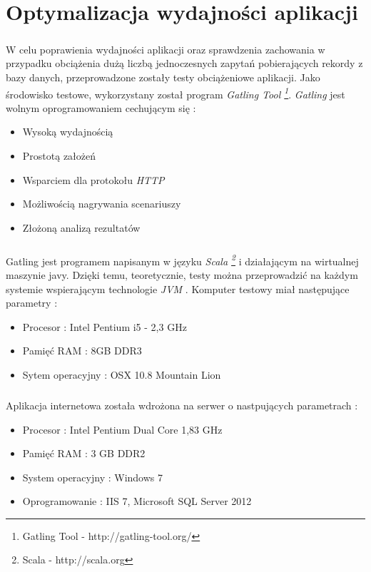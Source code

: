 \chapter{Optymalizacja wydajności aplikacji} %
\label{cha:wdra_anie}

\paragraph{} %
\label{par:}
W celu poprawienia wydajności aplikacji oraz sprawdzenia zachowania w przypadku obciążenia dużą liczbą jednoczesnych zapytań pobierających rekordy z bazy danych, przeprowadzone zostały testy obciążeniowe aplikacji. Jako środowisko testowe, wykorzystany został program \textit{Gatling Tool \footnote{Gatling Tool - http://gatling-tool.org/}}. \textit{Gatling} jest wolnym oprogramowaniem cechującym się :
\begin{itemize}
 	\item Wysoką wydajnością
 	\item Prostotą założeń
 	\item Wsparciem dla protokołu \textit{HTTP}
 	\item Możliwością nagrywania scenariuszy
 	\item Złożoną analizą rezultatów
 \end{itemize} 

\paragraph{} %
\label{par:}
Gatling jest programem napisanym w języku \textit{Scala \footnote{Scala - http://scala.org}} i działającym na wirtualnej maszynie javy. Dzięki temu, teoretycznie, testy można przeprowadzić na każdym systemie wspierającym technologie \textit{JVM} . Komputer testowy miał następujące parametry :
\begin{itemize}
	\item Procesor : Intel Pentium i5 - 2,3 GHz
	\item Pamięć RAM : 8GB DDR3
	\item Sytem operacyjny : OSX 10.8 Mountain Lion
\end{itemize}

\paragraph{} %
 \label{par:}
 Aplikacja internetowa została wdrożona na serwer o nastpujących parametrach :
 \begin{itemize}
 	\item Procesor : Intel Pentium Dual Core 1,83 GHz
 	\item Pamięć RAM : 3 GB DDR2
 	\item System operacyjny : Windows 7
 	\item Oprogramowanie : IIS 7, Microsoft SQL Server 2012
 \end{itemize}



